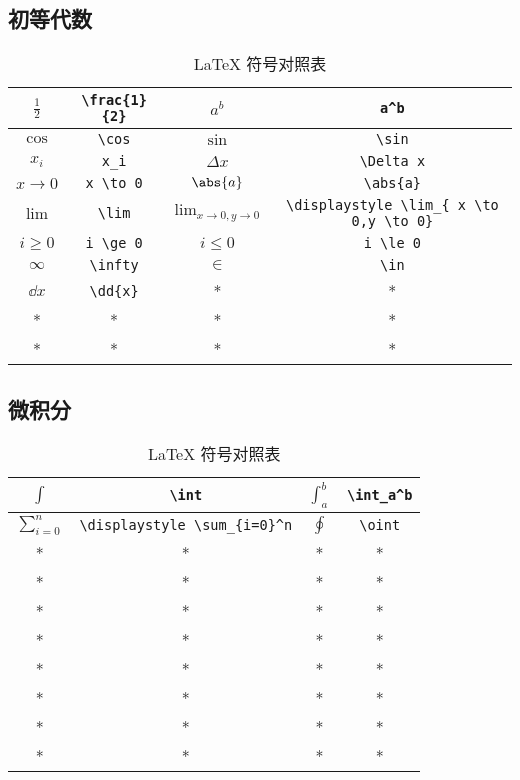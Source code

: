 
\subsection{初等代数}
\begin{table}[ht]
\centering
\caption{LaTeX 符号对照表}\label{tab_TeXSym0}
\begin{tabular}{|c|c|c|c|}
\hline
$\frac{1}{2}$ & \verb|\frac{1}{2}| & $a^b$ & \verb|a^b| \\
\hline
$\cos$ & \verb|\cos| & $\sin$ & \verb|\sin| \\
\hline
$x_i$ & \verb|x_i| & $\Delta x$& \verb|\Delta x| \\
\hline
$x \to 0$ & \verb|x \to 0| & $\abs{a}$ & \verb|\abs{a}| \\
\hline
$\lim$ & \verb|\lim| & $\displaystyle \lim_{ x \to 0,y \to 0}$ & \verb|\displaystyle \lim_{ x \to 0,y \to 0}| \\
\hline
$i \ge 0$& \verb|i \ge 0| & $i \le 0$ & \verb|i \le 0| \\
\hline
$\infty$ & \verb|\infty| & $\in$ & \verb|\in| \\
\hline
$\dd{x}$ & \verb|\dd{x}| & * & * \\
\hline
* & * & * & * \\
\hline
* & * & * & * \\
\hline
\end{tabular}
\end{table}


\subsection{微积分}
\begin{table}[ht]
\centering
\caption{LaTeX 符号对照表}\label{tab_TeXSym1}
\begin{tabular}{|c|c|c|c|}
\hline
$\int$ & \verb|\int| & $\int_a^b$ & \verb|\int_a^b| \\
\hline
$\displaystyle \sum_{i=0}^n$ & \verb|\displaystyle \sum_{i=0}^n| & $\oint$ & \verb|\oint| \\
\hline
* & * & * & * \\
\hline
* & * & * & * \\
\hline
* & * & * & * \\
\hline
* & * & * & * \\
\hline
* & * & * & * \\
\hline
* & * & * & * \\
\hline
* & * & * & * \\
\hline
* & * & * & * \\
\hline
\end{tabular}
\end{table}
